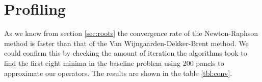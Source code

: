 \documentclass[a4paper, oneside]{discothesis}
\begin{document}
\section{Profiling}
As we know from section \ref{sec:roots} the convergence rate of the Newton-Raphson method is faster than that of the Van Wijngaarden-Dekker-Brent method.
We could confirm this by checking the amount of iteration the algorithms took to find the first eight minima in the baseline problem using 200 panels to approximate our operators.
The results are shown in the table \ref{tbl:conv}.
\begin{table}[H]
	\centering
	\caption{Steps taken until convergence for first eight minima found on our baseline problem.}
	\label{tbl:conv}
\end{table}
\end{document}
